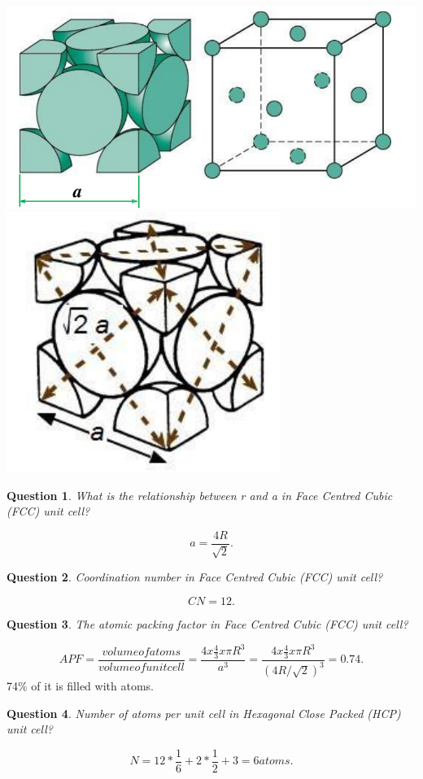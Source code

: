 \documentclass[13]{article}
\newtheorem{exer}{Question}
\begin{document}
\begin{center}
\includegraphics[scale=0.5]{figures/10.png} \includegraphics[scale=0.5]{figures/11.png}
\end{center}
\begin{exer}
What is the relationship between r and a in Face Centred Cubic (FCC) unit cell?
\end{exer}
\[
	a = \frac{4R}{\sqrt{2}} 
.\] 
\begin{exer}
Coordination number in Face Centred Cubic (FCC) unit cell?
\end{exer}
\[
CN=12
.\] 
\begin{exer}
The atomic packing factor in Face Centred Cubic (FCC) unit cell?
\end{exer}
\[
	APF = \frac{volume of atoms}{volume of unit cell} = \frac{4x \frac{4}{3} x \pi R^3}{a^3}= \frac{4x \frac{4}{3} x \pi R^3}{(4R/\sqrt{2})^3} = 0.74
.\] 
74\% of it is filled with atoms. 
\begin{exer}
Number of atoms per unit cell in  Hexagonal Close Packed (HCP) unit cell?
\end{exer}
\[
N = 12* \frac{1}{6}  + 2 * \frac{1}{2} + 3 = 6 atoms
.\]
\end{document}
